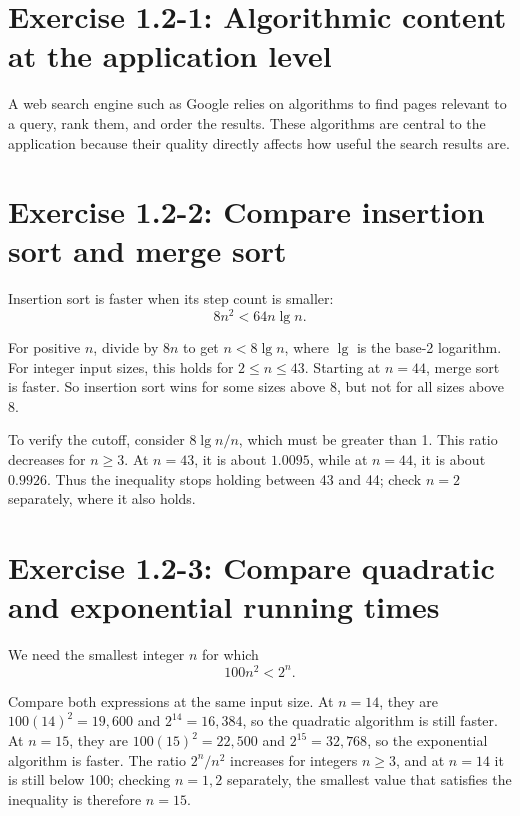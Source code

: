 \section{Exercise 1.2-1: Algorithmic content at the application level}

A web search engine such as Google relies on algorithms to find pages relevant
to a query, rank them, and order the results. These algorithms are central to
the application because their quality directly affects how useful the search
results are.

\section{Exercise 1.2-2: Compare insertion sort and merge sort}

Insertion sort is faster when its step count is smaller:
\begin{equation*}
    8n^2 < 64n \lg n.
\end{equation*}

For positive $n$, divide by $8n$ to get $n < 8\lg n$, where $\lg$ is the
base-2 logarithm. For integer input sizes, this holds for $2 \le n \le 43$.
Starting at $n=44$, merge sort is faster. So insertion sort wins for some sizes
above 8, but not for all sizes above 8.

To verify the cutoff, consider $8\lg n/n$, which must be greater than 1. This
ratio decreases for $n \ge 3$. At $n=43$, it is about $1.0095$, while at
$n=44$, it is about $0.9926$. Thus the inequality stops holding between 43 and
44; check $n=2$ separately, where it also holds.

\section{Exercise 1.2-3: Compare quadratic and exponential running times}

We need the smallest integer $n$ for which
\begin{equation*}
    100n^2 < 2^n.
\end{equation*}

Compare both expressions at the same input size. At $n=14$, they are
$100(14)^2=19{,}600$ and $2^{14}=16{,}384$, so the quadratic algorithm is
still faster. At $n=15$, they are $100(15)^2=22{,}500$ and
$2^{15}=32{,}768$, so the exponential algorithm is faster. The ratio
$2^n/n^2$ increases for integers $n \ge 3$, and at $n=14$ it is still below
100; checking $n=1,2$ separately, the smallest value that satisfies the
inequality is therefore $n=15$.

